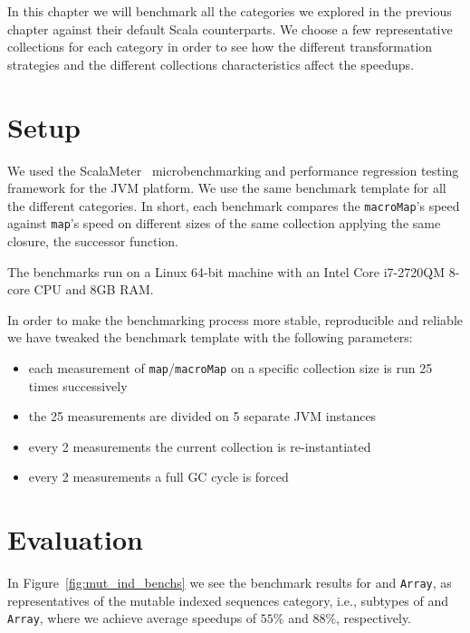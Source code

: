 \label{benchmarks}

In this chapter we will benchmark all the categories we explored in
the previous chapter against their default Scala counterparts. We choose a few
representative collections for each category in order to see how the different
transformation strategies and the different collections characteristics affect
the speedups.

\section{Setup}

We used the ScalaMeter~\cite{axel22:scalameter} microbenchmarking and performance regression
testing framework for the JVM platform. We use the same benchmark template for
all the different categories. In short, each benchmark compares the \texttt{macroMap}'s speed against \texttt{map}'s speed
on different sizes of the same collection applying the same closure, the
successor function.

The benchmarks run on a Linux 64-bit machine with an Intel Core i7-2720QM 8-core
CPU and 8GB RAM.

In order to make the benchmarking process more stable, reproducible and reliable
we have tweaked the benchmark template with the following parameters:

\begin{itemize}
 \item 
  each measurement of \texttt{map}/\texttt{macroMap} on a specific collection size is run 25
times successively
 \item
  the 25 measurements are divided on 5 separate JVM instances
 \item
  every 2 measurements the current collection is re-instantiated
 \item
  every 2 measurements a full GC cycle is forced
\end{itemize}


\section{Evaluation}

In Figure~\ref{fig:mut_ind_benchs} we see the benchmark results for  
and \texttt{Array}, as representatives of the mutable indexed
sequences category, i.e., subtypes of  and
\texttt{Array}, where we achieve average speedups of $55\%$ and $88\%$, respectively.

